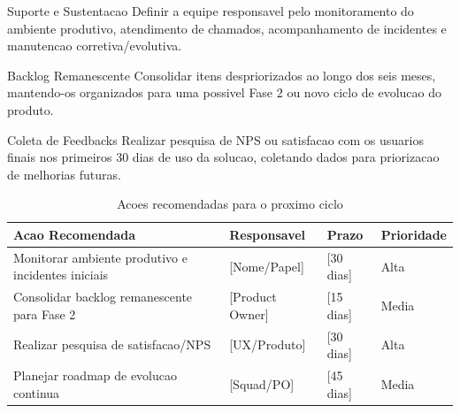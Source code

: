 \documentclass[12pt,a4paper]{article}
\newcommand{\placeholder}[1]{\textcolor{MediumGray}{[#1]}}
\begin{document}
\begin{tcolorbox}[
  colback=white,
  colframe=PrimaryBlue,
  title=\textbf{Plano Pos-Entrega},
  colbacktitle=PrimaryBlue,
  coltitle=white
]
  \begin{minipage}[t]{0.31\textwidth}
    \begin{successbox}{Suporte e Sustentacao}
      Definir a equipe responsavel pelo monitoramento do ambiente produtivo, atendimento de chamados, acompanhamento de incidentes e manutencao corretiva/evolutiva.
    \end{successbox}
  \end{minipage}
  \hfill
  \begin{minipage}[t]{0.31\textwidth}
    \begin{infobox}{Backlog Remanescente}
      Consolidar itens despriorizados ao longo dos seis meses, mantendo-os organizados para uma possivel Fase 2 ou novo ciclo de evolucao do produto.
    \end{infobox}
  \end{minipage}
  \hfill
  \begin{minipage}[t]{0.31\textwidth}
    \begin{notebox}{Coleta de Feedbacks}
      Realizar pesquisa de NPS ou satisfacao com os usuarios finais nos primeiros 30 dias de uso da solucao, coletando dados para priorizacao de melhorias futuras.
    \end{notebox}
  \end{minipage}
\end{tcolorbox}

\begin{table}[H]
  \centering
  \caption{Acoes recomendadas para o proximo ciclo}
  \begin{tabularx}{\textwidth}{@{}Y L{3.2cm}L{2.4cm}C{2.4cm}@{}}
    \toprule
    \textbf{Acao Recomendada} & \textbf{Responsavel} & \textbf{Prazo} & \textbf{Prioridade} \\
    \midrule
    Monitorar ambiente produtivo e incidentes iniciais & \placeholder{Nome/Papel} & \placeholder{30 dias} & Alta \\
    Consolidar backlog remanescente para Fase 2 & \placeholder{Product Owner} & \placeholder{15 dias} & Media \\
    Realizar pesquisa de satisfacao/NPS & \placeholder{UX/Produto} & \placeholder{30 dias} & Alta \\
    Planejar roadmap de evolucao continua & \placeholder{Squad/PO} & \placeholder{45 dias} & Media \\
    \bottomrule
  \end{tabularx}
\end{table}
\end{document}
